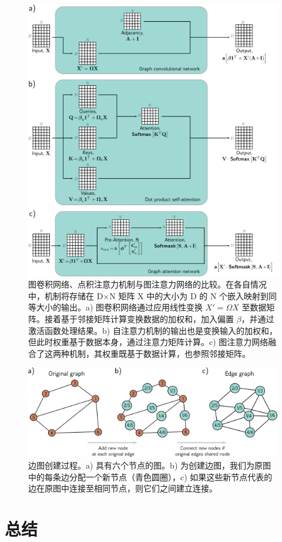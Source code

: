 \begin{figure}[ht!]
\centering
\includegraphics[width=0.7\linewidth]{png/chapter13/GraphTransformer.png}
\caption{图卷积网络、点积注意力机制与图注意力网络的比较。在各自情况中，机制将存储在 D×N 矩阵 X 中的大小为 D 的 N 个嵌入映射到同等大小的输出。a) 图卷积网络通过应用线性变换 \(X \prime = \Omega X\) 至数据矩阵。接着基于邻接矩阵计算变换数据的加权和，加入偏置 \(\beta\)，并通过激活函数处理结果。b) 自注意力机制的输出也是变换输入的加权和，但此时权重基于数据本身，通过注意力矩阵计算。c) 图注意力网络融合了这两种机制，其权重既基于数据计算，也参照邻接矩阵。}
\end{figure}



\begin{figure}[ht!]
\centering
\includegraphics[width=0.7\linewidth]{png/chapter13/GraphAdjoint.png}
\caption{边图创建过程。a) 具有六个节点的图。b) 为创建边图，我们为原图中的每条边分配一个新节点（青色圆圈），c) 如果这些新节点代表的边在原图中连接至相同节点，则它们之间建立连接。}
\end{figure}

\section{总结}

